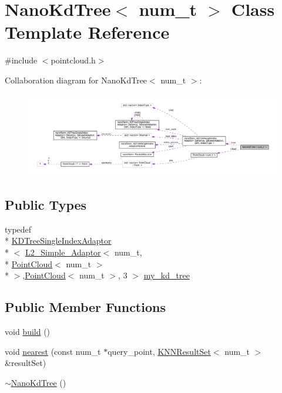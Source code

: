 \hypertarget{class_nano_kd_tree}{\section{Nano\-Kd\-Tree$<$ num\-\_\-t $>$ Class Template Reference}
\label{class_nano_kd_tree}
}


{\ttfamily \#include $<$pointcloud.\-h$>$}



Collaboration diagram for Nano\-Kd\-Tree$<$ num\-\_\-t $>$\-:
\nopagebreak
\begin{figure}[H]
\begin{center}
\leavevmode
\includegraphics[width=350pt]{class_nano_kd_tree__coll__graph}
\end{center}
\end{figure}
\subsection*{Public Types}
\begin{DoxyCompactItemize}
\item 
typedef \\*
\hyperlink{classnanoflann_1_1_k_d_tree_single_index_adaptor}{K\-D\-Tree\-Single\-Index\-Adaptor}\\*
$<$ \hyperlink{structnanoflann_1_1_l2___simple___adaptor}{L2\-\_\-\-Simple\-\_\-\-Adaptor}$<$ num\-\_\-t, \\*
\hyperlink{struct_point_cloud}{Point\-Cloud}$<$ num\-\_\-t $>$\\*
 $>$,\hyperlink{struct_point_cloud}{Point\-Cloud}$<$ num\-\_\-t $>$, 3 $>$ \hyperlink{class_nano_kd_tree_a31489b03f921330be3b4895011e18eb7}{my\-\_\-kd\-\_\-tree}
\end{DoxyCompactItemize}
\subsection*{Public Member Functions}
\begin{DoxyCompactItemize}
\item 
void \hyperlink{class_nano_kd_tree_a1f6e888c847903c0a0d965f3bef5bef2}{build} ()
\item 
void \hyperlink{class_nano_kd_tree_adeb9a7b244da0ee8987ab98fdb775609}{nearest} (const num\-\_\-t $\ast$query\-\_\-point, \hyperlink{classnanoflann_1_1_k_n_n_result_set}{K\-N\-N\-Result\-Set}$<$ num\-\_\-t $>$ \&result\-Set)
\item 
\hyperlink{class_nano_kd_tree_a524914051c4b2927846dbf078e0a3859}{$\sim$\-Nano\-Kd\-Tree} ()
\end{DoxyCompactItemize}
